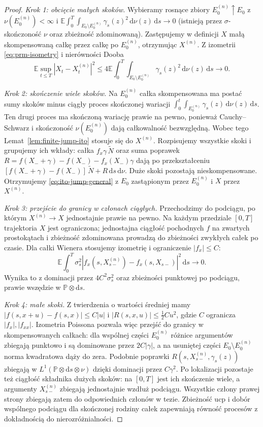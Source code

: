 \documentclass[11pt,a4paper,oneside]{report}
\numberwithin{equation}{chapter}
\theoremstyle{plain}
\theoremstyle{definition}
\theoremstyle{remark}
\newcommand{\Prob}{\mathbb{P}}
\newcommand{\E}{\mathbb{E}}
\newcommand{\dd}{\mathrm{d}}
\begin{document}
\begin{proof}
\emph{Krok 1: obcięcie małych skoków.} Wybieramy rosnące
zbiory $E_0^{(n)}\uparrow E_0$ z
$\nu(E_0^{(n)})<\infty$ i
$\E\int_0^T\int_{E_0\setminus E_0^{(n)}}\gamma_s(z)^2
\,\dd\nu(z)\,\dd s\to0$ (istnieją przez $\sigma$-skończoność
$\nu$ oraz zbieżność zdominowaną).
Zastępujemy w definicji $X$ małą skompensowaną całkę
przez całkę po $E_0^{(n)}$, otrzymując $X^{(n)}$.
Z izometrii \eqref{eq:prm-isometry} i nierówności Dooba
\[
\E\sup_{t\le T}|X_t-X_t^{(n)}|^2
\le4\E\int_0^T\int_{E_0\setminus E_0^{(n)}}\gamma_s(z)^2
\,\dd\nu(z)\,\dd s\longrightarrow0.
\]

\emph{Krok 2: skończenie wiele skoków.} Na $E_0^{(n)}$
całka skompensowana ma postać sumy skoków minus
ciągły proces skończonej wariacji
$\int_0^t\int_{E_0^{(n)}}\gamma_s(z)\,\dd\nu(z)\,\dd s$.
Ten drugi proces ma skończoną wariację prawie na pewno,
ponieważ Cauchy--Schwarz i skończoność $\nu(E_0^{(n)})$
dają całkowalność bezwzględną. Wobec tego
Lemat~\ref{lem:finite-jump-ito} stosuje się do $X^{(n)}$.
Rozpisujemy wszystkie skoki i grupujemy ich wkłady:
całka $f_x\gamma\,\widetilde N$ oraz suma poprawek
$R=f(X_-+\gamma)-f(X_-)-f_x(X_-)\gamma$ dają
po przekształceniu
$[f(X_-+\gamma)-f(X_-)]\,\widetilde N+R\,\dd s\,\dd\nu$.
Duże skoki pozostają nieskompensowane. Otrzymujemy
\eqref{eq:ito-jump-general} z $E_0$ zastąpionym przez
$E_0^{(n)}$ i $X$ przez $X^{(n)}$.

\emph{Krok 3: przejście do granicy w członach ciągłych.}
Przechodzimy do podciągu, po którym $X^{(n)}\to X$
jednostajnie prawie na pewno. Na każdym przedziale
$[0,T]$ trajektoria $X$ jest ograniczona; jednostajna
ciągłość pochodnych $f$ na zwartych prostokątach
i zbieżność zdominowana prowadzą do zbieżności
zwykłych całek po czasie. Dla całki Wienera stosujemy
izometrię i ograniczenie $|f_x|\le C$:
\[
\E\int_0^T\sigma_s^2
|f_x(s,X^{(n)}_{s-})-f_x(s,X_{s-})|^2\,\dd s\to0.
\]
Wynika to z dominacji przez $4C^2\sigma_s^2$ oraz
zbieżności punktowej po podciągu, prawie wszędzie
w $\Prob\otimes\dd s$.

\emph{Krok 4: małe skoki.} Z twierdzenia o wartości
średniej mamy
$|f(s,x+u)-f(s,x)|\le C|u|$ i
$|R(s,x,u)|\le\frac12C u^2$, gdzie $C$ ogranicza
$|f_x|,|f_{xx}|$. Izometria Poissona pozwala więc
przejść do granicy w skompensowanych całkach:
dla wspólnej części $E_0^{(n)}$ różnice argumentów
zbiegają punktowo i są dominowane przez $2C|\gamma|$,
a na usuniętej części $E_0\setminus E_0^{(n)}$
norma kwadratowa dąży do zera. Podobnie poprawki
$R(s,X^{(n)}_{s-},\gamma_s(z))$ zbiegają w
$L^1(\Prob\otimes\dd s\otimes\nu)$ dzięki dominacji
przez $C\gamma^2$. Po lokalizacji pozostaje też
ciągłość składnika dużych skoków: na $[0,T]$ jest ich
skończenie wiele, a argumenty $X^{(n)}_{s-}$ zbiegają
jednostajnie wzdłuż podciągu. Wszystkie człony prawej
strony zbiegają zatem do odpowiednich członów w tezie.
Zbieżność ucp i dobór wspólnego podciągu dla skończonej
rodziny całek zapewniają równość procesów z dokładnością
do nierozróżnialności.
\end{proof}
\end{document}
